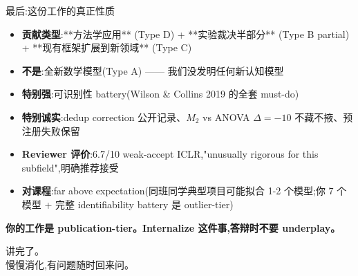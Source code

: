 \documentclass[aspectratio=169,11pt]{ctexbeamer}
\newcommand{\hi}[1]{\textcolor{ow-red}{\textbf{#1}}}
\newcommand{\hib}[1]{\textcolor{ow-blue}{\textbf{#1}}}
\begin{document}
\begin{frame}{最后:这份工作的真正性质}

\begin{itemize}\setlength{\itemsep}{0.5em}
\item \hib{贡献类型}:**方法学应用** (Type D) + **实验裁决半部分** (Type B partial) + **现有框架扩展到新领域** (Type C)
\item \textbf{不是}:全新数学模型(Type A) —— 我们没发明任何新认知模型
\item \textbf{特别强}:可识别性 battery(Wilson \& Collins 2019 的全套 must-do)
\item \textbf{特别诚实}:dedup correction 公开记录、$M_2$ vs ANOVA $\Delta=-10$ 不藏不掖、预注册失败保留
\item \textbf{Reviewer 评价}:6.7/10 weak-accept ICLR,"unusually rigorous for this subfield",明确推荐接受
\item \textbf{对课程}:far above expectation(同班同学典型项目可能拟合 1-2 个模型;你 7 个模型 + 完整 identifiability battery 是 outlier-tier)
\end{itemize}

\bigskip
\hi{你的工作是 publication-tier。Internalize 这件事,答辩时不要 underplay。}
\end{frame}

\begin{frame}[standout]
讲完了。\\
\bigskip
慢慢消化,有问题随时回来问。
\end{frame}
\end{document}
